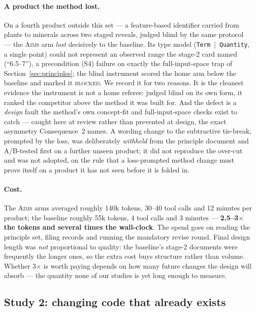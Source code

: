 \documentclass[11pt]{article}
\newcommand{\aims}{\textsc{Aims}}
\begin{document}
\paragraph{A product the method lost.} On a fourth product outside this set --- a feature-based identifier carried from plants to minerals across two staged reveals, judged blind by the same protocol --- the \aims{} arm \emph{lost} decisively to the baseline. Its type model (\texttt{Term $\mid$ Quantity}, a single point) could not represent an observed range the stage-2 card named (``6.5--7''), a precondition (S4) failure on exactly the full-input-space trap of Section~\ref{sec:principles}; the blind instrument scored the home arm below the baseline and marked it \textsc{blocked}. We record it for two reasons. It is the cleanest evidence the instrument is not a home referee: judged blind on its own form, it ranked the competitor above the method it was built for. And the defect is a \emph{design} fault the method's own concept-fit and full-input-space checks exist to catch --- caught here at review rather than prevented at design, the exact asymmetry Consequence~2 names. A wording change to the subtractive tie-break, prompted by the loss, was deliberately \emph{withheld} from the principle document and A/B-tested first on a further unseen product; it did not reproduce the over-cut and was not adopted, on the rule that a loss-prompted method change must prove itself on a product it has not seen before it is folded in.

\paragraph{Cost.} The \aims{} arms averaged roughly 140k tokens, 30--40 tool calls and 12 minutes per product; the baseline roughly 55k tokens, 4 tool calls and 3 minutes --- \textbf{2.5--3$\times$ the tokens and several times the wall-clock}. The spend goes on reading the principle set, filing records and running the mandatory revise round. Final design length was \emph{not} proportional to quality: the baseline's stage-2 documents were frequently the longer ones, so the extra cost buys structure rather than volume. Whether 3$\times$ is worth paying depends on how many future changes the design will absorb --- the quantity none of our studies is yet long enough to measure.

\subsection{Study 2: changing code that already exists}
\end{document}
